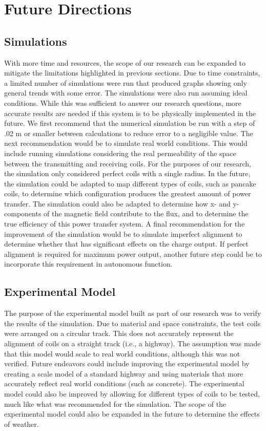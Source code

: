 
\renewcommand{\thechapter}{6}

\chapter{Future Directions}
\section{Simulations}
With more time and resources, the scope of our research can be expanded to mitigate the limitations highlighted in 
previous sections. Due to time constraints, a limited number of simulations were run that produced graphs showing 
only general trends with some error. The simulations were also run assuming ideal conditions. While this was 
sufficient to answer our research questions, more accurate results are needed if this system is to be physically 
implemented in the future. We first recommend that the numerical simulation be run with a step of .02 m or smaller 
between calculations to reduce error to a negligible value. The next recommendation would be to simulate real world 
conditions. This would include running simulations considering the real permeability of the space between the 
transmitting and receiving coils. For the purposes of our research, the simulation only considered perfect coils 
with a single radius. In the future, the simulation could be adapted to map different types of coils, such as pancake 
coils, to determine which configuration produces the greatest amount of power transfer. The simulation could also be 
adapted to determine how x- and y-components of the magnetic field contribute to the flux, and to determine the true 
efficiency of this power transfer system. A final recommendation for the improvement of the simulation would be to 
simulate imperfect alignment to determine whether that has significant effects on the charge output. If perfect 
alignment is required for maximum power output, another future step could be to incorporate this requirement in 
autonomous function.

\section{Experimental Model}
The purpose of the experimental model built as part of our research was to verify the results of the simulation. 
Due to material and space constraints, the test coils were arranged on a circular track. This does not accurately 
represent the alignment of coils on a straight track (i.e., a highway). The assumption was made that this model 
would scale to real world conditions, although this was not verified. Future endeavors could include improving the 
experimental model by creating a scale model of a standard highway and using materials that more accurately reflect 
real world conditions (such as concrete). The experimental model could also be improved by allowing for different 
types of coils to be tested, much like what was recommended for the simulation. The scope of the experimental model 
could also be expanded in the future to determine the effects of weather.